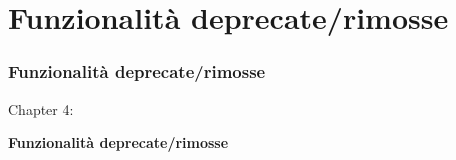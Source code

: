 %

\section{Funzionalità deprecate/rimosse}
\begin{frame}[fragile]
	\frametitle{Funzionalità deprecate/rimosse}

	\begin{center}\huge{Chapter 4:}\end{center}
	\begin{center}\huge{\color{typo3darkgrey}\textbf{Funzionalità deprecate/rimosse}}\end{center}

\end{frame}


